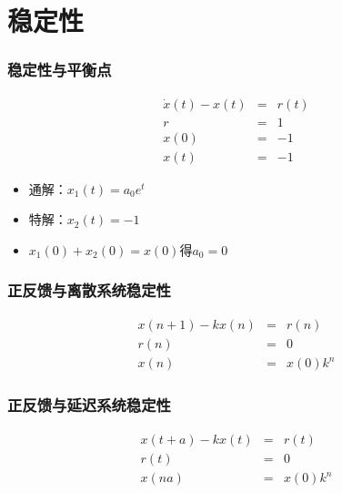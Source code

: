 \documentclass{beamer}
\begin{document}
\section{稳定性}
\label{sec-2}
\begin{frame}
\frametitle{稳定性与平衡点}
\label{sec-2-1}


\begin{eqnarray*}
\dot x(t)-x(t) & = & r(t)\\
r &=& 1 \\
x(0) &=& -1 \\
x(t) &=& -1
\end{eqnarray*}

\begin{itemize}
\item 通解：$x_1(t)=a_0e^t$
\item 特解：$x_2(t)=-1$
\item $x_1(0)+x_2(0)=x(0)$得$a_0=0$
\end{itemize}
\end{frame}
\begin{frame}
\frametitle{正反馈与离散系统稳定性}
\label{sec-2-2}

\begin{eqnarray*}
x(n+1)-kx(n) &=& r(n) \\
r(n) & = & 0 \\
x(n) &=& x(0)k^n
\end{eqnarray*}
\end{frame}
\begin{frame}
\frametitle{正反馈与延迟系统稳定性}
\label{sec-2-3}

\begin{eqnarray*}
x(t+a)-kx(t) &=& r(t) \\
r(t) &=& 0 \\
x(na) &=& x(0)k^{n}
\end{eqnarray*}
\end{frame}
\end{document}
